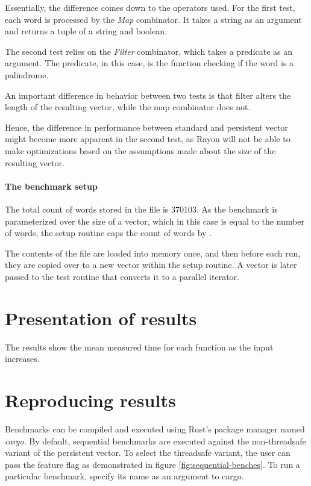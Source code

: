Essentially, the difference comes down to the operators used. For the first test, each word is processed by the \emph{Map} combinator. It takes a string as an argument and returns a tuple of a string and boolean. 

The second test relies on the \emph{Filter} combinator, which takes a predicate as an argument. The predicate, in this case, is the function checking if the word is a palindrome. 

An important difference in behavior between two tests is that filter alters the length of the resulting vector, while the map combinator does not. 

Hence, the difference in performance between standard and persistent vector might become more apparent in the second test, as Rayon will not be able to make optimizations based on the assumptions made about the size of the resulting vector. 

\paragraph*{The benchmark setup}
The total count of words stored in the file is 370103. As the benchmark is parameterized over the size of a vector, which in this case is equal to the number of words, the setup routine caps the count of words by \n{}.

The contents of the file are loaded into memory once, and then before each run, they are copied over to a new vector within the setup routine. A vector is later passed to the test routine that converts it to a parallel iterator. 

\section{Presentation of results}
The results show the mean measured time for each function as the input increases. 

\section{Reproducing results}
Benchmarks can be compiled and executed using Rust's package manager named \emph{cargo}. By default, sequential benchmarks are executed against the non-threadsafe variant of the persistent vector. To select the threadsafe variant, the user can pass the \arc{} feature flag as demonstrated in figure \ref{fig:sequential-benches}. To run a particular benchmark, specify its name as an argument to cargo. 

